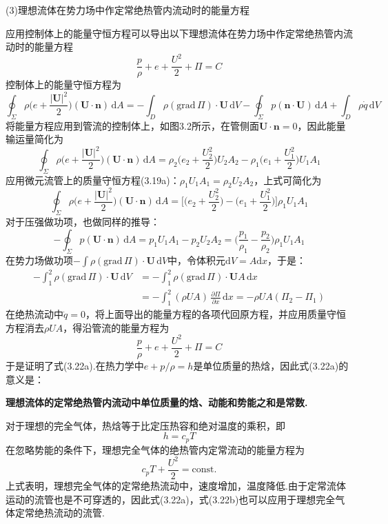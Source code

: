 (3)理想流体在势力场中作定常绝热管内流动时的能量方程

应用控制体上的能量守恒方程可以导出以下理想流体在势力场中作定常绝热管内流动时的能量方程
\begin{equation*}
\frac{p}{\rho}+e+\frac{U^{2}}{2}+\Pi=C
\tag{3.22a}
\end{equation*}
控制体上的能量守恒方程为
\[
\oint_\Sigma \rho\Big(e+\frac{|\boldsymbol{U}|^{2}}{2}\Big)(\boldsymbol{U}\cdot\boldsymbol{n})\,\mathrm{d}A=-\int_D \rho(\mathrm{grad}\,\Pi)\cdot\boldsymbol{U}\,\mathrm{d}V-\oint_\Sigma p(\boldsymbol{n}\cdot\boldsymbol{U})\,\mathrm{d}A+\int_D \rho\dot{q}\,\mathrm{d}V
\]
将能量方程应用到管流的控制体上，如图3.2所示，在管侧面$\boldsymbol{U}\cdot\boldsymbol{n}=0$，因此能量输运量简化为
\[
\oint_\Sigma \rho\Big(e+\frac{|\boldsymbol{U}|^{2}}{2}\Big)(\boldsymbol{U}\cdot\boldsymbol{n})\,\mathrm{d}A=\rho_2\Big(e_2+\frac{U_2^{2}}{2}\Big)U_2A_2-\rho_1\Big(e_1+\frac{U_1^{2}}{2}\Big)U_1A_1
\]
应用微元流管上的质量守恒方程(3.19a)：$\rho_1U_1A_1=\rho_2U_2A_2$，上式可简化为
\[
\oint_\Sigma \rho\Big(e+\frac{|\boldsymbol{U}|^{2}}{2}\Big)(\boldsymbol{U}\cdot\boldsymbol{n})\,\mathrm{d}A=\bigg[\Big(e_2+\frac{U_2^{2}}{2}\Big)-\Big(e_1+\frac{U_1^{2}}{2}\Big)\bigg]\rho_1U_1A_1
\]
对于压强做功项，也做同样的推导：
\[
-\oint_\Sigma p(\boldsymbol{U}\cdot\boldsymbol{n})\,\mathrm{d}A=p_1U_1A_1-p_2U_2A_2=\Big(\frac{p_1}{\rho_1}-\frac{p_2}{\rho_2}\Big)\rho_1U_1A_1
\]
在势力场做功项$-\displaystyle\int\rho(\mathrm{grad}\,\Pi)\cdot\boldsymbol{U}\,\mathrm{d}V$中，令体积元$\mathrm{d}V=A\mathrm{d}x$，于是：
\begin{align*}
-\int_1^2 \rho(\mathrm{grad}\,\Pi)\cdot\boldsymbol{U}\,\mathrm{d}V&=-\int_1^2 \rho(\mathrm{grad}\,\Pi)\cdot\boldsymbol{U}A\,\mathrm{d}x\\
&=-\int_1^2(\rho U A)\,\frac{\partial\Pi}{\partial x}\,\mathrm{d}x=-\rho U A(\Pi_2-\Pi_1)
\end{align*}
在绝热流动中$\dot{q}=0$，将上面导出的能量方程的各项代回原方程，并应用质量守恒方程消去$\rho U A$，得沿管流的能量方程为
\[
\frac{p}{\rho}+e+\frac{U^{2}}{2}+\Pi=C
\]
于是证明了式(3.22a).在热力学中$e+p/\rho=h$是单位质量的热焓，因此式(3.22a)的意义是：

\textbf{理想流体的定常绝热管内流动中单位质量的焓、动能和势能之和是常数.}

对于理想的完全气体，热焓等于比定压热容和绝对温度的乘积，即
\[
h=c_p T
\]
在忽略势能的条件下，理想完全气体的绝热管内定常流动的能量方程为
\begin{equation*}
c_p T+\frac{U^{2}}{2}=\mathrm{const.}
\tag{3.22b}
\end{equation*}
上式表明，理想完全气体的定常绝热流动中，速度增加，温度降低.由于定常流体运动的流管也是不可穿透的，因此式(3.22a)，式(3.22b)也可以应用于理想完全气体定常绝热流动的流管.

